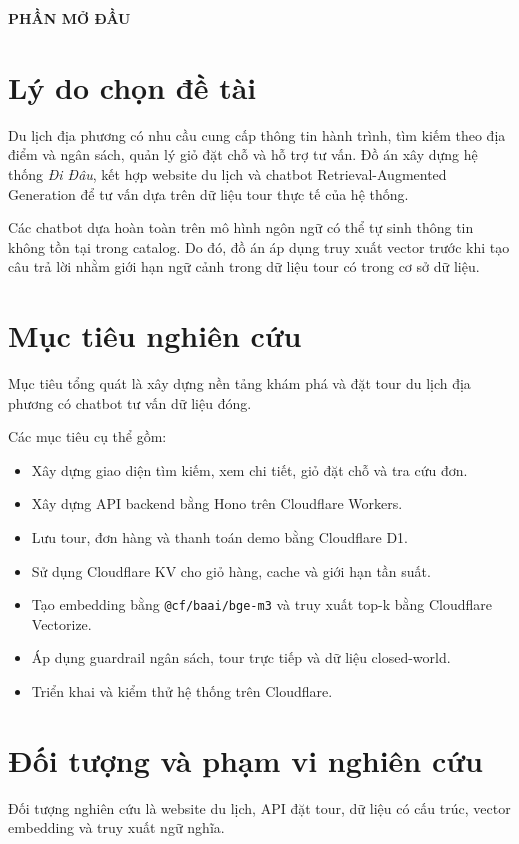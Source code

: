 
\vspace*{15pt}
\begin{center}
\large{\textbf{PHẦN MỞ ĐẦU}}
\end{center}

\section*{Lý do chọn đề tài}
Du lịch địa phương có nhu cầu cung cấp thông tin hành trình, tìm kiếm theo địa điểm và ngân sách, quản lý giỏ đặt chỗ và hỗ trợ tư vấn. Đồ án xây dựng hệ thống \emph{Đi Đâu}, kết hợp website du lịch và chatbot Retrieval-Augmented Generation để tư vấn dựa trên dữ liệu tour thực tế của hệ thống.

Các chatbot dựa hoàn toàn trên mô hình ngôn ngữ có thể tự sinh thông tin không tồn tại trong catalog. Do đó, đồ án áp dụng truy xuất vector trước khi tạo câu trả lời nhằm giới hạn ngữ cảnh trong dữ liệu tour có trong cơ sở dữ liệu.

\section*{Mục tiêu nghiên cứu}
Mục tiêu tổng quát là xây dựng nền tảng khám phá và đặt tour du lịch địa phương có chatbot tư vấn dữ liệu đóng.

Các mục tiêu cụ thể gồm:
\begin{itemize}
    \item Xây dựng giao diện tìm kiếm, xem chi tiết, giỏ đặt chỗ và tra cứu đơn.
    \item Xây dựng API backend bằng Hono trên Cloudflare Workers.
    \item Lưu tour, đơn hàng và thanh toán demo bằng Cloudflare D1.
    \item Sử dụng Cloudflare KV cho giỏ hàng, cache và giới hạn tần suất.
    \item Tạo embedding bằng \texttt{@cf/baai/bge-m3} và truy xuất top-k bằng Cloudflare Vectorize.
    \item Áp dụng guardrail ngân sách, tour trực tiếp và dữ liệu closed-world.
    \item Triển khai và kiểm thử hệ thống trên Cloudflare.
\end{itemize}

\section*{Đối tượng và phạm vi nghiên cứu}
Đối tượng nghiên cứu là website du lịch, API đặt tour, dữ liệu có cấu trúc, vector embedding và truy xuất ngữ nghĩa.

